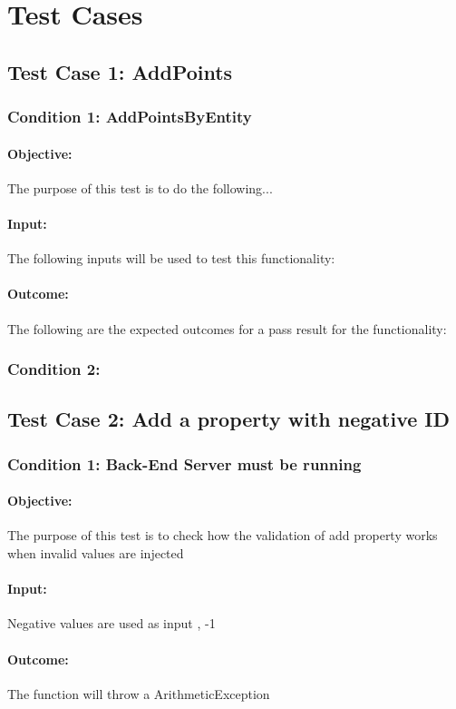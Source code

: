 \documentclass[a4paper,12pt]{article}
\begin{document}
\section{Test Cases}
\subsection{Test Case 1: AddPoints}
\subsubsection{Condition 1: AddPointsByEntity}
\paragraph{Objective:}The purpose of this test is to do the following...
\paragraph{Input:}The following inputs will be used to test this functionality:
\paragraph{Outcome: }The following are the expected outcomes for a pass result for the functionality:

\subsubsection{Condition 2:}

\subsection{Test Case 2: Add a property with negative ID}
\subsubsection{Condition 1: Back-End Server must be running}
\paragraph{Objective:}The purpose of this test is to check how the validation of add property works when invalid values are injected 
\paragraph{Input:} Negative values are used as input , -1
\paragraph{Outcome: } The function will throw a ArithmeticException
\end{document}
